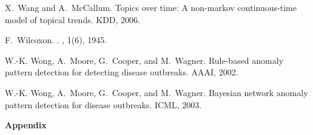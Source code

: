 \documentclass[twoside,leqno,twocolumn]{article}
\begin{document}
\begin{thebibliography}{9}
X.~Wang and A.~McCallum.
\newblock Topics over time: A non-markov continuous-time model of topical
  trends.
\newblock KDD, 2006.

F.~Wilcoxon.
.
, 1(6), 1945.

W.-K. Wong, A.~Moore, G.~Cooper, and M.~Wagner.
\newblock Rule-based anomaly pattern detection for detecting disease outbreaks.
\newblock AAAI, 2002.

W.-K. Wong, A.~Moore, G.~Cooper, and M.~Wagner.
\newblock Bayesian network anomaly pattern detection for disease outbreaks.
\newblock ICML, 2003.
\end{thebibliography}


\clearpage
\appendix
\noindent\textbf{Appendix}
\end{document}
